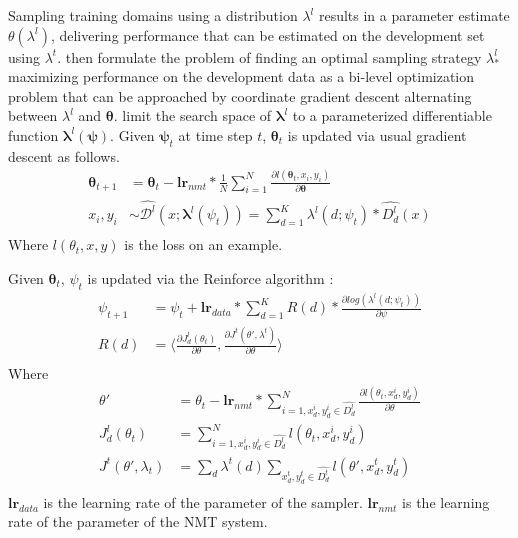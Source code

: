 \documentclass[11pt,a4paper]{article}
\newcommand{\fyTodo}[1]{\Todo[FY:]{\textcolor{orange}{#1}}}
\newcommand{\system}[1]{\texttt{{#1}}}
\newcommand{\vlambda}{\ensuremath{\boldsymbol\lambda}\xspace} %
\newcommand{\vtheta}{\ensuremath{\boldsymbol\theta}\xspace} %
\newcommand{\vpsi}{\ensuremath{\boldsymbol\psi}\xspace} %
\begin{document}
Sampling training domains using a distribution $\lambda^{l}$ results in a parameter estimate $\theta(\lambda^{l})$, delivering performance that can be estimated on the development set using $\lambda^{t}$. \citet{Wang20optimizing,Wang20balancing} then formulate the problem of finding an optimal sampling strategy $\lambda^{l}_{*}$ maximizing performance on the development data as a bi-level optimization problem that can be approached by coordinate gradient descent alternating between $\lambda^{l}$ and $\vtheta$. \citet{Wang20balancing} limit the search space of $\vlambda^{l}$ to a parameterized differentiable function $\vlambda^{l}(\vpsi)$. Given $\vpsi_t$ at time step $t$, $\vtheta_t$ is updated via usual gradient descent as follows.
\begin{align*}
\vtheta_{t+1} &= \vtheta_t - \mathbf{lr}_{nmt} * \frac{1}{N} \displaystyle{\mathop{\sum}_{i=1}^N} \frac{\partial l(\vtheta_t, x_i,y_i)}{\partial \vtheta} \\
x_i,y_i &\sim \widehat{\mathcal{D}^l}(x;\vlambda^l(\psi_t)) = \displaystyle{\mathop{\sum}_{d=1}^K} \lambda^l(d;\psi_t) * \widehat{D^l_d}(x) \\
\end{align*}
Where $l(\theta_t,x,y)$ is the loss on an example.

Given $\vtheta_t$, $\psi_t$ is updated via the Reinforce algorithm \cite{Williams92simple}:\fyTodo{Rewrite this correctly with domain average reward}
\begin{align*}
\psi_{t+1} &= \psi_t + \mathbf{lr}_{data} * \displaystyle{\mathop{\sum}_{d=1}^K} R(d) * \frac{\partial log(\lambda^l(d;\psi_t))}{\partial \psi} \\
  R(d) &= \langle \frac{\partial J^l_d(\theta_t)}{\partial \theta}, \frac{\partial J^t(\theta', \lambda^t)}{\partial \theta} \rangle \\
\end{align*}
Where
\begingroup
\allowdisplaybreaks
\begin{align*}
\theta' &= \theta_t - \mathbf{lr}_{nmt} * \displaystyle{\mathop{\sum}_{i=1,x^i_d,y^i_d \in \widehat{D^l_d}}^N} \frac{\partial l(\theta_t,x^i_d,y^i_d)}{\partial \theta} \\
  J^l_d(\theta_t) &= \displaystyle{\mathop{\sum}_{i=1,x^i_d,y^i_d \in \widehat{D^l_d}}^N} l(\theta_t,x^i_d,y^i_d) \\
  J^t(\theta',\lambda_t) &= \displaystyle{\mathop{\sum}_{d}}\lambda^t(d)\displaystyle{\mathop{\sum}_{x^t_d,y^t_d \in \widehat{D^t_d}}} l(\theta',x^t_d,y^t_d)\\
\end{align*}
\endgroup
$\mathbf{lr}_{data}$ is the learning rate of the parameter of the sampler. $\mathbf{lr}_{nmt}$ is the learning rate of the parameter of the NMT system. \fyTodo{Explain lr, may be more}\fyTodo{More refs to the algorithm }
\end{document}
